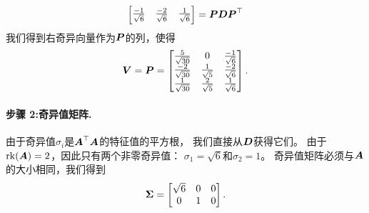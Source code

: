\begin{example}[计算SVD]
\begin{equation}
\begin{bmatrix}
        \frac{-1}{\sqrt{6}} & \frac{-2}{\sqrt{6}} & \frac{1}{\sqrt{6}}
    \end{bmatrix}
    = \P\D\P^\top
\end{equation}
我们得到右奇异向量作为$\P$的列，使得
\begin{equation}
    \V = \P =
    \begin{bmatrix}
        \frac{5}{\sqrt{30}} & 0 & \frac{-1}{\sqrt{6}} \\
        \frac{-2}{\sqrt{30}} & \frac{1}{\sqrt{5}} & \frac{-2}{\sqrt{6}} \\
        \frac{1}{\sqrt{30}} & \frac{2}{\sqrt{5}} & \frac{1}{\sqrt{6}}
    \end{bmatrix}.
\end{equation}
\paragraph{步骤 2:奇异值矩阵.}
由于奇异值$\sigma_i$是$\A^\top\A$的特征值的平方根，
我们直接从$\D$获得它们。
由于$\rk(\A) = 2$，因此只有两个非零奇异值：
$\sigma_1 = \sqrt{6}$和$\sigma_2 = 1$。
奇异值矩阵必须与$\A$的大小相同，我们得到
\begin{equation}
    \bs{\Sigma} =
    \begin{bmatrix}
        \sqrt{6} & 0 & 0 \\
        0 & 1 & 0
    \end{bmatrix}.
\end{equation}

\end{example}
